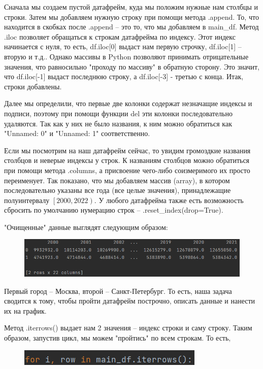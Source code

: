 Сначала мы создаем пустой датафрейм, куда мы положим нужные нам столбцы и строки. Затем мы добавляем нужную строку при помощи метода .append. То, что находится в скобках после .append -- это то, что мы добавляем в main\_df. Метод .iloc позволяет обращаться к строкам датафрейма по индексу. Этот индекс начинается с нуля, то есть, df.iloc[0] выдаст нам первую строчку, df.iloc[1] -- вторую и т.д.. Однако массивы в Python позволяют принимать отрицательные значения, что равносильно "проходу по массиву" в обратную сторону. Это значит, что df.iloc[-1] выдаст последнюю строку, а df.iloc[-3] - третью с конца. Итак, строки добавлены.

Далее мы определили, что первые две колонки содержат незначащие индексы и подписи, поэтому при помощи функции del эти колонки последовательно удаляются. Так как у них не было названия, к ним можно обратиться как "Unnamed: 0" и "Unnamed: 1" соответственно.

Если мы посмотрим на наш датафрейм сейчас, то увидим громоздкие названия столбцов и неверые индексы у строк. К названиям столбцов можно обратиться при помощи метода .columns, а присвоение чего-либо соизмеримого их просто переименует. Так показано, что мы добавляем массив (array), в котором последовательно указаны все года (все целые значения), принадлежащие полуинтервалу $\left[2000, 2022\right)$. У любого датафрейма также есть возможность сбросить по умолчанию нумерацию строк -- .reset\_index(drop=True).

"Очищенные" данные выглядят следующим образом:

\begin{figure}[H]
	\begin{center}
		\includegraphics{include/fig/cleardf}
	\end{center}
\end{figure}

Первый город -- Москва, второй -- Санкт-Петербург. То есть, наша задача сводится к тому, чтобы пройти датафрейм построчно, описать данные и нанести их на график.

Метод .iterrows() выдает нам 2 значения -- индекс строки и саму строку. Таким образом, запустив цикл, мы можем "пройтись" по всем строкам. То есть,

\begin{figure}[H]
	\begin{center}
		\includegraphics{include/fig/iterrows}
	\end{center}
\end{figure}

